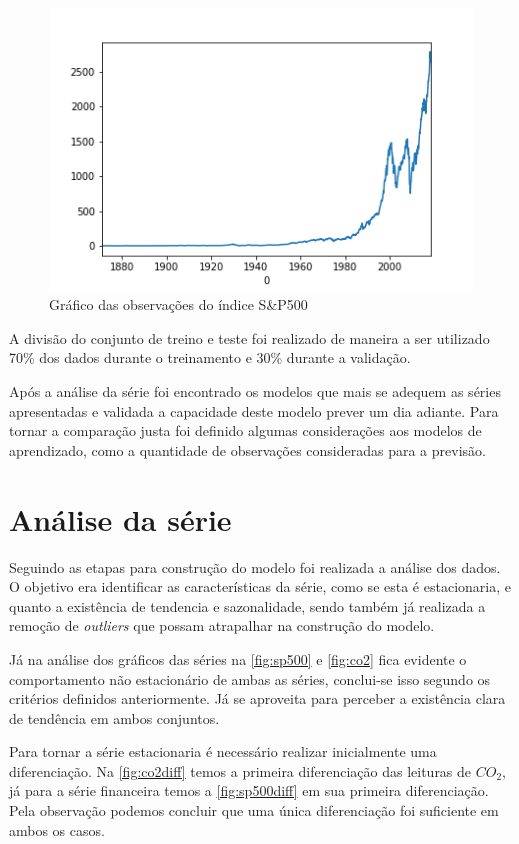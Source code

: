 \documentclass[
    12pt,
    oneside,
    a4paper,
    english,
    brazil
]{abntex2}
\begin{document}
\begin{figure}[ht]
    \centering
    \caption{Gráfico das observações do índice S\&P500}\label{fig:sp500}
    \includegraphics[width=.5\linewidth]{images/sp500.png}
\end{figure}

A  divisão do  conjunto  de treino  e  teste  foi realizado  de  maneira a  ser
utilizado 70\% dos dados durante o treinamento e 30\% durante a validação.

Após a análise da série foi encontrado os modelos que mais se adequem as séries
apresentadas e validada  a capacidade deste modelo prever um  dia adiante. Para
tornar a  comparação justa  foi definido algumas  considerações aos  modelos de
aprendizado, como a quantidade de observações consideradas para a previsão.

\section{Análise da série}

Seguindo as etapas para construção do modelo foi realizada a análise dos dados.
O  objetivo  era identificar  as  características  da  série,  como se  esta  é
estacionaria, e quanto  a existência de tendencia e  sazonalidade, sendo também
já realizada a remoção de \textit{outliers} que possam atrapalhar na construção
do modelo.

Já   na   análise   dos   gráficos  das   séries   na   \autoref{fig:sp500}   e
\autoref{fig:co2} fica  evidente o comportamento  não estacionário de  ambas as
séries, conclui-se  isso segundo  os critérios  definidos anteriormente.  Já se
aproveita para perceber a existência clara de tendência em ambos conjuntos.

Para  tornar  a  série  estacionaria é  necessário  realizar  inicialmente  uma
diferenciação.  Na \autoref{fig:co2diff}  temos  a  primeira diferenciação  das
leituras de $CO_2$, já para  a série financeira temos a \autoref{fig:sp500diff}
em sua primeira  diferenciação. Pela observação podemos concluir  que uma única
diferenciação foi suficiente em ambos os casos.
\end{document}

